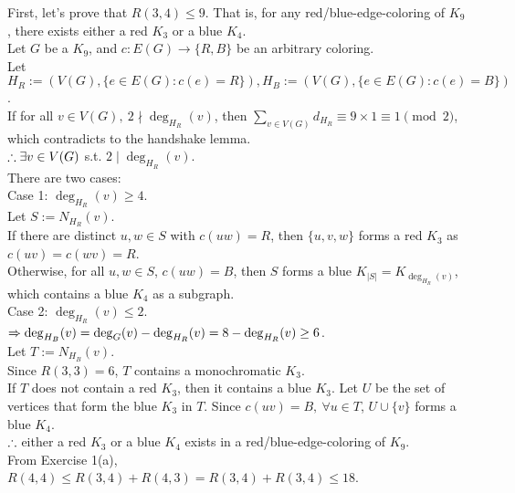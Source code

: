 \setcounter{pr}{1}
\begin{pr}
First, let's prove that $R(3, 4)\leq9$. That is, for any red/blue-edge-coloring of $K_9$, there exists either a red $K_3$ or a blue $K_4$.\\
Let $G$ be a $K_9$, and $c:E(G)\to\{R, B\}$ be an arbitrary coloring.\\
Let $H_R:=(V(G), \{e\in E(G):c(e)=R\}), H_B:=(V(G), \{e\in E(G):c(e)=B\})$.\\
If for all $v\in V(G),\ 2\nmid\deg_{H_R}(v)$, then $\sum_{v\in V(G)}d_{H_R}\equiv9\times1\equiv1\pmod2$, which contradicts to the handshake lemma.\\
$\therefore\exists v\in V(G)$ s.t. $2\mid\deg_{H_R}(v)$.\\
There are two cases:\\
Case 1: $\deg_{H_R}(v)\geq4$.\\
Let $S:=N_{H_R}(v)$.\\
If there are distinct $u, w\in S$ with $c(uw)=R$, then $\{u, v, w\}$ forms a red $K_3$ as $c(uv)=c(wv)=R$.\\
Otherwise, for all $u, w\in S$, $c(uw)=B$, then $S$ forms a blue $K_{|S|}=K_{\deg_{H_R}(v)}$, which contains a blue $K_4$ as a subgraph.\\
Case 2: $\deg_{H_R}(v)\leq2$.\\
$\Rightarrow\deg_{H_B}(v)=\deg_G(v)-\deg_{H_R}(v)=8-\deg_{H_R}(v)\geq6$.\\
Let $T:=N_{H_B}(v)$.\\
Since $R(3, 3)=6$, $T$ contains a monochromatic $K_3$.\\
If $T$ does not contain a red $K_3$, then it contains a blue $K_3$. Let $U$ be the set of vertices that form the blue $K_3$ in $T$. Since $c(uv)=B,\ \forall u\in T$, $U\cup\{v\}$ forms a blue $K_4$.\\
$\therefore$ either a red $K_3$ or a blue $K_4$ exists in a red/blue-edge-coloring of $K_9$.\\
From Exercise 1(a), $R(4, 4)\leq R(3, 4)+R(4, 3)=R(3, 4)+R(3, 4)\leq18$.
\end{pr}
